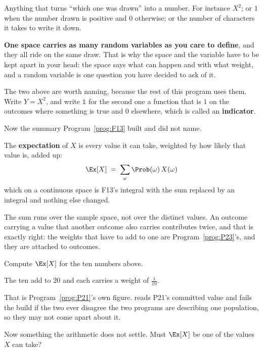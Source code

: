 \begin{fr}
\begin{ansblock}
Anything that turns \enquote{which one was drawn} into a number. For instance
$X^{2}$; or $1$ when the number drawn is positive and $0$ otherwise; or the
number of characters it takes to write it down.
\end{ansblock}

\textbf{One space carries as many random variables as you care to define}, and
they all ride on the same draw. That is why the space and the variable have to
be kept apart in your head: the space says what can happen and with what
weight, and a random variable is one question you have decided to ask of it.

The two above are worth naming, because the rest of this program uses them.
Write $Y = X^{2}$, and write $\mathbb{1}$ for the second one \dash{} a function
that is $1$ on the outcomes where something is true and $0$ elsewhere, which is
called an \textbf{indicator}.
\end{fr}

\begin{fr}
Now the summary Program~\ref{prog:F13} built and did not name.

The \textbf{expectation} of $X$ is every value it can take, weighted by how
likely that value is, added up:
\[ \Ex[X] \;=\; \sum_{\omega} \Prob(\omega)\, X(\omega) \]
which on a continuous space is F13's integral with the sum replaced by an
integral and nothing else changed.

The sum runs over the sample space, not over the distinct values. An outcome
carrying a value that another outcome also carries contributes twice, and that
is exactly right: the weights that have to add to one are
Program~\ref{prog:P23}'s, and they are attached to outcomes.

Compute $\Ex[X]$ for the ten numbers above.
\dotline
\nextframe
\end{fr}

\begin{fr}

The ten add to $20$ and each carries a weight of $\frac{1}{10}$.

That is Program~\ref{prog:P21}'s own figure.
 reads P21's committed value and fails the
build if the two ever disagree \dash{} the two programs are describing one
population, so they may not come apart about it.

Now something the arithmetic does not settle. Must $\Ex[X]$ be one of the
values $X$ can take?
\dotline
\nextframe
\end{fr}


